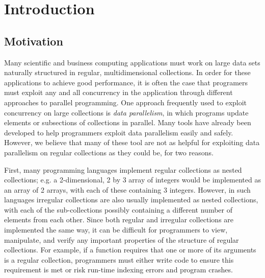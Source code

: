 \chapter{Introduction}

\section{Motivation}
Many scientific and business computing applications must work on large data sets naturally structured in regular, multidimensional collections.
In order for these applications to achieve good performance, it is often the case that programers must exploit any and all concurrency in the application through different approaches to parallel programming.
One approach frequently used to exploit concurrency on large collections is \textit{data parallelism}, in which programs update elements or subsections of collections in parallel.
Many tools have already been developed to help programmers exploit data parallelism easily and safely. %
However, we believe that many of these tool are not as helpful for exploiting data parallelism on regular collections as they could be, for two reasons.

First, many programming languages implement regular collections as nested collections;
e.g. a 2-dimensional, 2 by 3 array of integers would be implemented as an array of 2 arrays, with each of these containing 3 integers.
However, in such languages irregular collections are also usually implemented as nested collections, with each of the sub-collections possibly containing a different number of elements from each other.
Since both regular and irregular collections are implemented the same way,
it can be difficult for programmers to view, manipulate, and verify any important properties of the structure of regular collections.
For example, if a function requires that one or more of its arguments is a regular collection, programmers must either write code to ensure this requirement is met or risk run-time indexing errors and program crashes.

